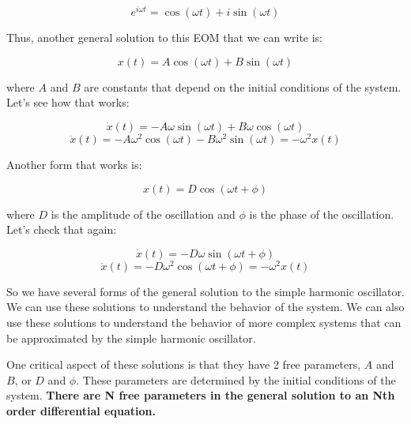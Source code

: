 \documentclass[11pt]{article}
\begin{document}
\[e^{i\omega t} = \cos(\omega t) + i\sin(\omega t)\]

Thus, another general solution to this EOM that we can write is:

\[x(t) = A \cos(\omega t) + B \sin(\omega t)\]

where \(A\) and \(B\) are constants that depend on the initial
conditions of the system. Let's see how that works:

\[\dot{x}(t) = -A \omega \sin(\omega t) + B \omega \cos(\omega t)\]
\[\ddot{x}(t) = -A \omega^2 \cos(\omega t) - B \omega^2 \sin(\omega t) = -\omega^2 x(t)\]

Another form that works is:

\[x(t) = D \cos(\omega t + \phi)\]

where \(D\) is the amplitude of the oscillation and \(\phi\) is the
phase of the oscillation. Let's check that again:

\[\dot{x}(t) = -D \omega \sin(\omega t + \phi)\]
\[\ddot{x}(t) = -D \omega^2 \cos(\omega t + \phi) = -\omega^2 x(t)\]

So we have several forms of the general solution to the simple harmonic
oscillator. We can use these solutions to understand the behavior of the
system. We can also use these solutions to understand the behavior of
more complex systems that can be approximated by the simple harmonic
oscillator.

One critical aspect of these solutions is that they have 2 free
parameters, \(A\) and \(B\), or \(D\) and \(\phi\). These parameters are
determined by the initial conditions of the system. \textbf{There are N
free parameters in the general solution to an Nth order differential
equation.}

    


    
    
    
\end{document}
